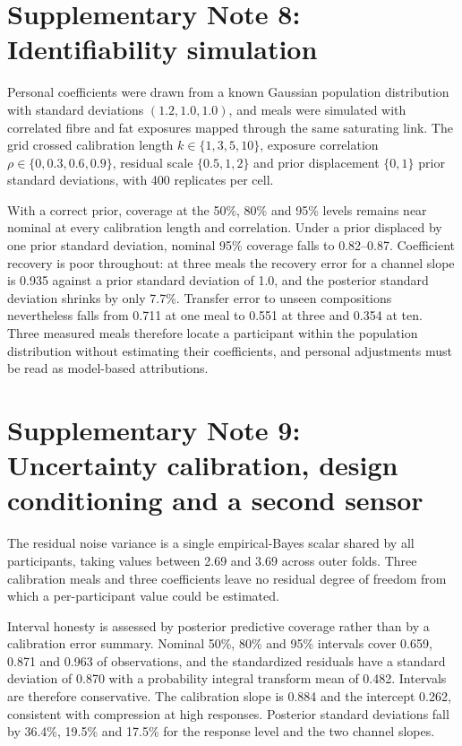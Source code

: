 \documentclass[10pt]{article}
\begin{document}


\clearpage

\section*{Supplementary Note 8: Identifiability simulation}

Personal coefficients were drawn from a known Gaussian population distribution with standard
deviations $(1.2,1.0,1.0)$, and meals were simulated with correlated fibre and fat exposures
mapped through the same saturating link. The grid crossed calibration length
$k\in\{1,3,5,10\}$, exposure correlation $\rho\in\{0,0.3,0.6,0.9\}$, residual scale
$\{0.5,1,2\}$ and prior displacement $\{0,1\}$ prior standard deviations, with 400 replicates per
cell.

With a correct prior, coverage at the 50\%, 80\% and 95\% levels remains near nominal at every
calibration length and correlation. Under a prior displaced by one prior standard deviation,
nominal 95\% coverage falls to 0.82--0.87. Coefficient recovery is poor throughout: at three meals
the recovery error for a channel slope is 0.935 against a prior standard deviation of 1.0, and the
posterior standard deviation shrinks by only 7.7\%. Transfer error to unseen compositions
nevertheless falls from 0.711 at one meal to 0.551 at three and 0.354 at ten. Three measured meals
therefore locate a participant within the population distribution without estimating their
coefficients, and personal adjustments must be read as model-based attributions.


\clearpage

\section*{Supplementary Note 9: Uncertainty calibration, design conditioning and a second sensor}

The residual noise variance is a single empirical-Bayes scalar shared by all participants, taking
values between 2.69 and 3.69 across outer folds. Three calibration meals and three coefficients
leave no residual degree of freedom from which a per-participant value could be estimated.

Interval honesty is assessed by posterior predictive coverage rather than by a calibration error
summary. Nominal 50\%, 80\% and 95\% intervals cover 0.659, 0.871 and 0.963 of observations, and
the standardized residuals have a standard deviation of 0.870 with a probability integral
transform mean of 0.482. Intervals are therefore conservative. The calibration slope is 0.884 and
the intercept 0.262, consistent with compression at high responses. Posterior standard deviations
fall by 36.4\%, 19.5\% and 17.5\% for the response level and the two channel slopes.
\end{document}
